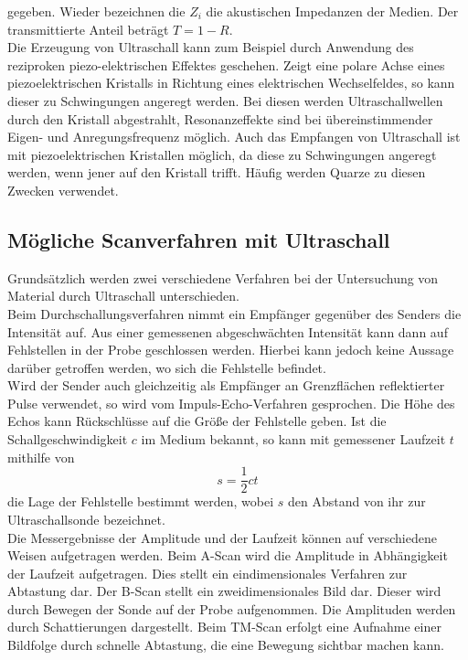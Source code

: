 gegeben. Wieder bezeichnen die $Z_i$ die akustischen Impedanzen der Medien. Der
transmittierte Anteil beträgt $T = 1 - R$.\\
Die Erzeugung von Ultraschall kann zum Beispiel durch Anwendung des reziproken piezo-elektrischen
Effektes geschehen. Zeigt eine polare Achse eines piezoelektrischen Kristalls in Richtung
eines elektrischen Wechselfeldes, so kann dieser zu Schwingungen angeregt werden.
Bei diesen werden Ultraschallwellen durch den Kristall abgestrahlt, Resonanzeffekte
sind bei übereinstimmender Eigen- und Anregungsfrequenz möglich. Auch das Empfangen
von Ultraschall ist mit piezoelektrischen Kristallen möglich, da diese zu Schwingungen
angeregt werden, wenn jener auf den Kristall trifft. Häufig werden Quarze zu diesen
Zwecken verwendet.

\subsection{Mögliche Scanverfahren mit Ultraschall}
\label{subsec:theorie2}
Grundsätzlich werden zwei verschiedene Verfahren bei der Untersuchung von Material
durch Ultraschall unterschieden.\\
Beim Durchschallungsverfahren nimmt ein Empfänger gegenüber des Senders die Intensität auf.
Aus einer gemessenen abgeschwächten Intensität kann dann auf Fehlstellen in der Probe geschlossen werden.
Hierbei kann jedoch keine Aussage darüber getroffen werden, wo sich die Fehlstelle befindet.\\
Wird der Sender auch gleichzeitig als Empfänger an Grenzflächen reflektierter Pulse verwendet, so wird vom Impuls-Echo-Verfahren
gesprochen. Die Höhe des Echos kann Rückschlüsse auf die Größe der Fehlstelle geben.
Ist die Schallgeschwindigkeit $c$ im Medium bekannt, so kann mit gemessener Laufzeit $t$
mithilfe von
\begin{equation}
  s = \frac{1}{2} ct
\end{equation}
die Lage der Fehlstelle bestimmt werden, wobei $s$ den Abstand von ihr zur Ultraschallsonde bezeichnet.\\
Die Messergebnisse der Amplitude und der Laufzeit können auf verschiedene Weisen aufgetragen werden.
Beim A-Scan wird die Amplitude in Abhängigkeit der Laufzeit aufgetragen. Dies stellt
ein eindimensionales Verfahren zur Abtastung dar. Der B-Scan stellt ein zweidimensionales
Bild dar. Dieser wird durch Bewegen der Sonde auf der Probe aufgenommen. Die Amplituden
werden durch Schattierungen dargestellt.
Beim TM-Scan erfolgt eine Aufnahme einer Bildfolge durch schnelle Abtastung, die eine Bewegung sichtbar machen kann.

